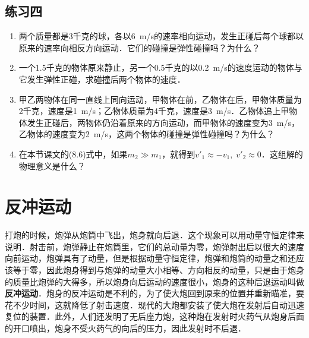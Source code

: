 \subsection*{练习四}
\begin{enumerate}
    \item 两个质量都是3千克的球，各以\qty{6}{m/s}的速率相向运动，发生正碰后每个球都以原来的速率向相反方向运动．它们的碰撞是弹性碰撞吗？为什么？
    \item 一个1.5千克的物体原来静止，另一个0.5千克的以\qty{0.2}{m/s}的速度运动的物体与它发生弹性正碰，求碰撞后两个物体的速度．
    \item 甲乙两物体在同一直线上同向运动，甲物体在前，乙物体在后，甲物体质量为2千克，速度是\qty{1}{m/s}；乙物体质量为4千克，速度是\qty{3}{m/s}．乙物体追上甲物体发生正碰后，两物体仍沿着原来的方向运动，而甲物体的速度变为\qty{3}{m/s}，乙物体的速度变为\qty{2}{m/s}，这两个物体的碰撞是弹性碰撞吗？为什么？
    \item 在本节课文的(8.6)式中，如果$m_2\gg m_1$，就得到$v'_1\approx -v_1,\; v'_2\approx 0$．这组解的物理意义是什么？
\end{enumerate}

\newpage
\section{反冲运动}
打炮的时候，炮弹从炮筒中飞出，炮身就向后退．这个现象可以用动量守恒定律来说明．射击前，炮弹静止在炮筒里，它们的总动量为零，炮弹射出后以很大的速度向前运动，炮弹具有了动量，但是根据动量守恒定律，炮弹和炮筒的动量之和还应该等于零，因此炮身得到与炮弹的动量大小相等、方向相反的动量，只是由于炮身的质量比炮弹的大得多，所以炮身向后运动的速度很小，炮身的这种后退运动叫做\textbf{反冲运动}．炮身的反冲运动是不利的，为了使大炮回到原来的位置并重新瞄准，要花不少时间，这就降低了射击速度．现代的大炮都安装了使大炮在发射后自动迅速复位的装置．此外，人们还发明了无后座力炮，这种炮在发射时火药气从炮身后面的开口喷出，炮身不受火药气的向后的压力，因此发射时不后退．


